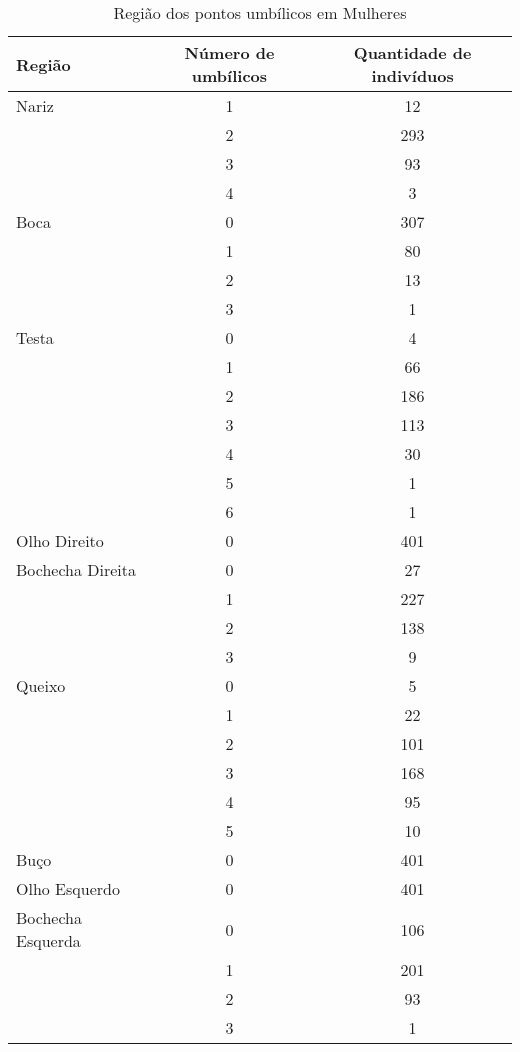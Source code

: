 \documentclass[a4paper,12pt]{article}
\begin{document}
\begin{table}[h!]
\centering
\caption{Região dos pontos umbílicos em Mulheres}
\begin{tabular}{l c c}
\hline
\textbf{Região} & \textbf{Número de umbílicos} & \textbf{Quantidade de indivíduos} \\
\hline
Nariz & 1 & 12 \\
      & 2 & 293 \\
      & 3 & 93 \\
      & 4 & 3 \\
\hline
Boca  & 0 & 307 \\
      & 1 & 80 \\
      & 2 & 13 \\
      & 3 & 1 \\
\hline
Testa & 0 & 4 \\
      & 1 & 66 \\
      & 2 & 186 \\
      & 3 & 113 \\
      & 4 & 30 \\
      & 5 & 1 \\
      & 6 & 1 \\
\hline
Olho Direito & 0 & 401 \\
\hline
Bochecha Direita & 0 & 27 \\
                 & 1 & 227 \\
                 & 2 & 138 \\
                 & 3 & 9 \\
\hline
Queixo & 0 & 5 \\
       & 1 & 22 \\
       & 2 & 101 \\
       & 3 & 168 \\
       & 4 & 95 \\
       & 5 & 10 \\
\hline
Buço & 0 & 401 \\
\hline
Olho Esquerdo & 0 & 401 \\
\hline
Bochecha Esquerda & 0 & 106 \\
                  & 1 & 201 \\
                  & 2 & 93 \\
                  & 3 & 1 \\
\hline
\end{tabular}
\end{table}
\end{document}

